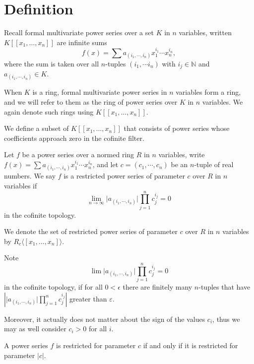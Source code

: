 \section{Definition}

Recall formal multivariate power series over a set $K$ in $n$ variables, written
$K [ \! [ x_1, \dots, x_n ] \! ]$ are infinite sums
\[
  f(x) = \sum a_{(i_1, \cdots, i_n)} x_1^{i_1} \cdots x_n^{i_n},
\]
where the sum is taken over all $n$-tuples $(i_1, \cdots i_n)$ with $i_j \in \mathbb{N}$ and
$a_{(i_1, \cdots, i_n)} \in K$.

When $K$ is a ring, formal multivariate power series in $n$ variables form a ring, and we will refer
to them as the ring of power series over $K$ in $n$ variables. We again denote such
rings using $K [ \! [ x_1, \dots, x_n ] \! ]$.

We define a subset of $K [ \! [ x_1, \dots, x_n ] \! ]$ that consists of power series whose
coefficients approach zero in the cofinite filter.

\begin{definition}
  Let $f$ be a power series over a normed ring $R$ in $n$ variables, write
  $f(x) = \sum a_{(i_1, \cdots, i_n)} x_1^{i_1} \cdots x_n^{i_n}$, and let
  $c = (c_1, \cdots, c_n)$ be an $n$-tuple of real numbers.
  We say $f$ is a restricted power series of parameter $c$ over $R$ in $n$ variables if
  \[
    \lim_{n \to \infty} \lvert a_{(i_1, \cdots, i_n)} \rvert \prod_{j=1}^{n} c_j^{i_j} = 0
  \]
  in the cofinite topology.

  We denote the set of restricted power series of parameter $c$ over $R$ in $n$ variables by
  $R_c \langle \! [ x_1, \dots, x_n ] \! \rangle$.
\end{definition}

\begin{remark}
  Note
  \[
    \lim \lvert a_{(i_1, \cdots, i_n)} \rvert \prod_{j=1}^{n} c_j^{i_j} = 0
  \]
  in the cofinite topology, if for all $0 < \epsilon$ there are finitely many $n$-tuples that have
  $\left \lvert \lvert a_{(i_1, \cdots, i_n)} \rvert \prod_{j=1}^{n} c_j^{i_j} \right \rvert$
  greater than $\varepsilon$.
\end{remark}

Moreover, it actually does not matter about the sign of the values $c_i$, thus we may as well consider
$c_i > 0$ for all $i$.

\begin{lemma}
  A power series $f$ is restricted for parameter $c$ if and only if it is restricted for parameter
  $\lvert c \rvert$.
\end{lemma}

